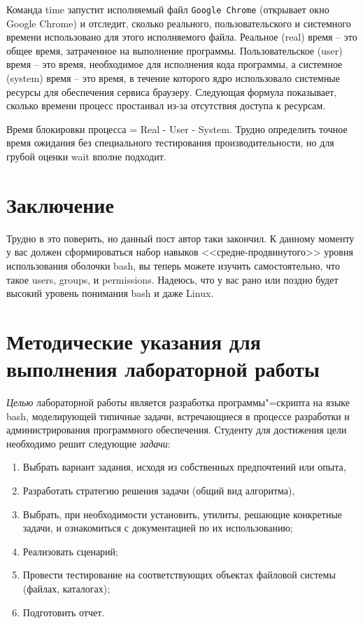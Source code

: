 \documentclass[12pt]{article}
\begin{document}
Команда time запустит  исполняемый файл \texttt{Google Chrome} (открывает окно
Google Chrome) и отследит, сколько реального, пользовательского и
системного времени использовано для этого исполняемого файла.
Реальное (real) время -- это общее время, затраченное на выполнение
программы. Пользовательское (user) время -- это время, необходимое для
исполнения кода программы, а системное (system) время -- это время, в
течение которого ядро использовало системные ресурсы для обеспечения
сервиса браузеру. Следующая формула показывает, сколько времени процесс
простаивал из-за отсутствия доступа к ресурсам.

Время блокировки процесса = Real - User - System.
Трудно определить точное время ожидания без специального тестирования
производительности, но для грубой оценки wait вполне подходит.

\hypertarget{Conclusion}{%
  \section*{\texorpdfstring{\protect\hyperlink{Conclusion}{}Заключение}{Заключение}}\label{Conclusion}}

Трудно в это поверить, но данный пост автор таки закончил. К данному
моменту у вас должен сформироваться набор навыков <<средне-продвинутого>> уровня использования оболочки bash, вы теперь можете изучить самостоятельно, что такое users, groups, и
permissions. Надеюсь, что у вас рано или поздно будет высокий уровень
понимания bash и даже Linux.

\section{Методические указания для выполнения лабораторной работы}

\emph{Целью} лабораторной работы является разработка программы"=скрипта на языке bash, моделирующей типичные задачи, встречающиеся в процессе разработки и администрирования программного обеспечения. Студенту для достижения цели необходимо решит следующие \emph{задачи}:
\begin{enumerate}
\item Выбрать вариант задания, исходя из собственных предпочтений или опыта,
\item Разработать стратегию решения задачи (общий вид алгоритма),
\item Выбрать, при необходимости установить, утилиты, решающие конкретные задачи, и ознакомиться с документацией по их использованию;
\item Реализовать сценарий;
\item Провести тестирование на соответствующих объектах файловой системы (файлах, каталогах);
\item Подготовить отчет.
\end{enumerate}
\end{document}
